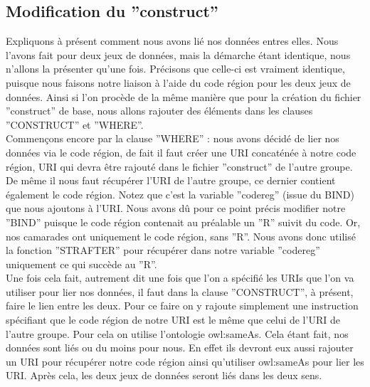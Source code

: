 \documentclass[a4paper,sffamily,12pt]{article}
\begin{document}
			\vspace{0.5cm}
			
		\subsection{Modification du ''construct''}
			
			\vspace{0.5cm}

			Expliquons à présent comment nous avons lié nos données entres elles. Nous l'avons fait pour deux jeux de données, mais la démarche étant identique, nous n'allons la présenter  qu'une fois. Précisons que celle-ci est vraiment identique, puisque nous faisons notre liaison à l'aide du code région pour les deux jeux de données. Ainsi si l'on procède de la même manière que pour la création du fichier ''construct'' de base, nous allons rajouter des éléments dans les clauses ''CONSTRUCT'' et ''WHERE''.  \\
			
			\indent Commençons encore par la clause ''WHERE'' : nous avons décidé de lier nos données via le code région, de fait il faut créer une URI concaténée à notre code région, URI qui devra être rajouté dans le fichier ''construct'' de l'autre groupe. De même il nous faut récupérer l'URI de l'autre groupe, ce dernier contient également le code région. Notez que c'est la variable ''codereg'' (issue du BIND) que nous ajoutons à l'URI. Nous avons dû pour ce point précis modifier notre ''BIND'' puisque le code région contenait au préalable un ''R'' suivit du code. Or, nos camarades ont uniquement le code région, sans ''R''. Nous avons donc utilisé la fonction ''STRAFTER'' pour récupérer dans notre variable ''codereg'' uniquement ce qui succède au ''R''. \\
			
			\indent Une fois cela fait, autrement dit une fois que l'on a spécifié les URIs que l'on va utiliser pour lier nos données, il faut dans la clause ''CONSTRUCT'', à présent, faire le lien entre les deux. Pour ce faire on y rajoute simplement une instruction spécifiant que le code région de notre URI est le même que celui de l'URI de l'autre groupe. Pour cela on utilise l'ontologie owl:sameAs. Cela étant fait, nos données sont liés ou du moins pour nous. En effet ils devront eux aussi rajouter un URI pour récupérer notre code région  ainsi qu'utiliser owl:sameAs pour lier les URI. Après cela, les deux jeux de données seront liés dans les deux sens. \\
			
\end{document}
